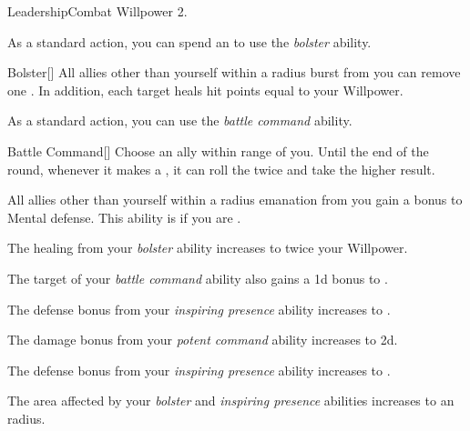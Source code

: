     \begin{feat}{Leadership}{Combat}
        \featpre Willpower 2.

         As a standard action, you can spend an  to use the \textit{bolster} ability.
        \begin{ability}{Bolster}[]
            All allies other than yourself within a \arealarge radius burst from you can remove one .
            In addition, each target heals hit points equal to your Willpower.
        \end{ability}

         As a standard action, you can use the \textit{battle command} ability.
        \begin{ability}{Battle Command}[]
            Choose an ally within \rngmed range of you.
            Until the end of the round, whenever it makes a , it can roll the  twice and take the higher result.
        \end{ability}

         All allies other than yourself within a \arealarge radius emanation from you gain a  bonus to Mental defense.
        This ability is  if you are .

         The healing from your \textit{bolster} ability increases to twice your Willpower.

         The target of your \textit{battle command} ability also gains a \plus1d bonus to .

         The defense bonus from your \textit{inspiring presence} ability increases to .

         The damage bonus from your \textit{potent command} ability increases to \plus2d.

         The defense bonus from your \textit{inspiring presence} ability increases to .

         The area affected by your \textit{bolster} and \textit{inspiring presence} abilities increases to an \areahuge radius.
    \end{feat}

